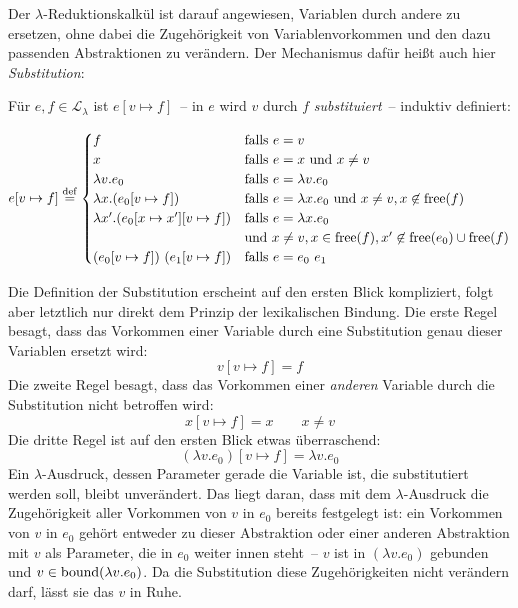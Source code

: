 Der $\lambda$-Reduktionskalkül ist darauf
angewiesen, Variablen durch andere zu ersetzen, ohne dabei die
Zugehörigkeit von Variablenvorkommen und den dazu passenden
Abstraktionen zu verändern.  Der Mechanismus dafür heißt auch hier
\textit{Substitution}:
%
\begin{definition}[Substitution]
  Für $e,f\in \mathcal{L}_{\lambda}$ ist $e[v\mapsto f]$~-- in $e$ wird $v$ durch $f$
  \textit{substituiert}~-- induktiv definiert:

  \begin{displaymath}
    e[v\mapsto f] \stackrel{\rm def}{=}
    \begin{cases}
      f & \text{falls } e = v\\
      x & \text{falls } e = x \text{ und } x \neq v\\
      \lambda v.e_0 & \text{falls } e = \lambda v.e_0\\
      \lambda x.(e_0[v\mapsto f]) & \text{falls } e = \lambda x.e_0 \text{
        und } x\neq v, x\not\in\operatorname{free}(f)\\
      \lambda x'.(e_0[x\mapsto x'][v\mapsto f]) & \text{falls }
      e = \lambda x.e_0 \\ & \text{und }
      x \neq v,x\in\operatorname{free}(f), x'\not\in\operatorname{free}(e_0)\cup\operatorname{free}(f)\\
      (e_0[v\mapsto f])~(e_1[v\mapsto f]) &
      \text{falls } e = e_0~e_1
    \end{cases}
  \end{displaymath}
  \end{definition}
%
Die Definition der Substitution erscheint auf den ersten Blick
kompliziert, folgt aber letztlich nur direkt dem Prinzip der
lexikalischen Bindung.  Die erste Regel besagt, dass das Vorkommen
einer Variable durch eine Substitution genau dieser Variablen ersetzt
wird:
%
\begin{displaymath}
      v[v\mapsto f] = f
\end{displaymath}
%
Die zweite Regel besagt, dass das Vorkommen einer \emph{anderen}
Variable durch die Substitution nicht betroffen wird:
%
\begin{displaymath}
    x[v\mapsto f] = x \qquad x\neq v
\end{displaymath}
%
Die dritte Regel ist auf den ersten Blick etwas überraschend:
%
\begin{displaymath}
    (\lambda v.e_0)[v\mapsto f] = \lambda v.e_0
\end{displaymath}
%
Ein $\lambda$-Ausdruck, dessen Parameter gerade die Variable ist, die
substitutiert werden soll, bleibt unverändert.  Das liegt daran, dass
mit dem $\lambda$-Ausdruck die Zugehörigkeit aller Vorkommen von $v$
in $e_0$ bereits festgelegt ist: ein Vorkommen von $v$ in $e_0$ gehört
entweder zu dieser Abstraktion oder einer anderen Abstraktion mit $v$
als Parameter, die in $e_0$ weiter innen steht~-- $v$ ist in $(\lambda
v.e_0)$ gebunden und $v\in\operatorname{bound}(\lambda v.e_0)$.
Da die Substitution diese Zugehörigkeiten nicht verändern darf, lässt
sie das $v$ in Ruhe.

